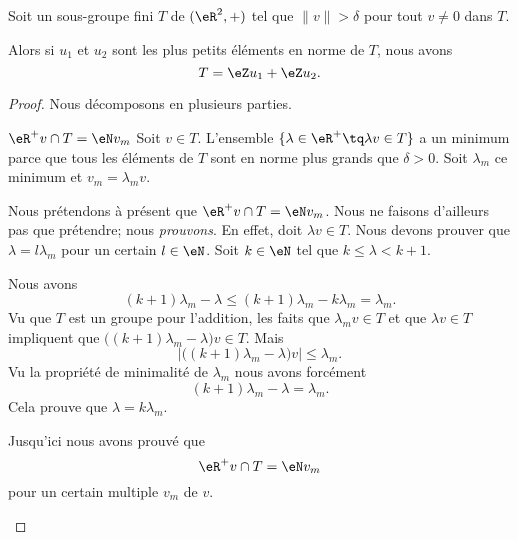 \begin{lemma}       \label{LEMooDGSJooCiBhZz}
    Soit un sous-groupe fini \( T\) de \( (\eR^2,+)\) tel que \( \| v \|>\delta \) pour tout \( v\neq 0\) dans \( T\).

    Alors si \( u_1\) et $u_2$ sont les plus petits éléments en norme de \( T\), nous avons
    \begin{equation}
        T=\eZ u_1+\eZ u_2.
    \end{equation}
\end{lemma}

\begin{proof}
    Nous décomposons en plusieurs parties.

    \begin{subproof}
        \item[\( \eR^+v\cap T=\eN v_m\)]
            Soit \( v\in T\). L'ensemble \( \{ \lambda \in \eR^+\tq \lambda v\in T\}\) a un minimum parce que tous les éléments de \( T\) sont en norme plus grands que \( \delta>0\). Soit \( \lambda_m\) ce minimum et \( v_m=\lambda_mv\).

            Nous prétendons à présent que \( \eR^+v\cap T=\eN v_m\). Nous ne faisons d'ailleurs pas que prétendre; nous \emph{prouvons}. En effet, doit \( \lambda v\in T\). Nous devons prouver que \( \lambda = l\lambda_m\) pour un certain \( l\in \eN\). Soit \( k\in \eN\) tel que \( k\leq \lambda<k+1\).

            Nous avons
            \begin{equation}
                (k+1)\lambda_m-\lambda\leq (k+1)\lambda_m-k\lambda_m=\lambda_m.
            \end{equation}
            Vu que \( T\) est un groupe pour l'addition, les faits que \( \lambda_mv\in T\) et que \( \lambda v\in T\) impliquent que \( \big( (k+1)\lambda_m-\lambda \big)v\in T\). Mais
            \begin{equation}
                | \big( (k+1)\lambda_m-\lambda \big)v |\leq \lambda_m.
            \end{equation}
            Vu la propriété de minimalité de \( \lambda_m\) nous avons forcément
            \begin{equation}
                (k+1)\lambda_m-\lambda = \lambda_m.
            \end{equation}
            Cela prouve que \( \lambda=k\lambda_m\). 
            
            Jusqu'ici nous avons prouvé que
            \begin{equation}
                \eR^+v\cap T=\eN v_m
            \end{equation}
            pour un certain multiple \( v_m\) de \( v\).


\end{subproof}
\end{proof}
